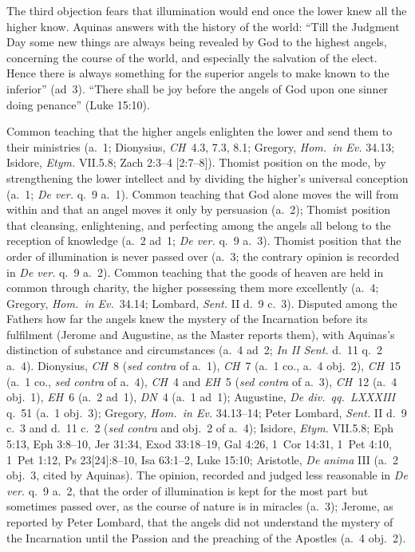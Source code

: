 The third objection fears that illumination would end once the lower knew
all the higher know. Aquinas answers with the history of the world: ``Till
the Judgment Day some new things are always being revealed by God to the
highest angels, concerning the course of the world, and especially the
salvation of the elect. Hence there is always something for the superior
angels to make known to the inferior'' (ad~3). ``There shall be joy before
the angels of God upon one sinner doing penance'' (Luke 15:10).

 {Common teaching that the higher angels enlighten the lower and send them
 to their ministries (a.~1; Dionysius, \emph{CH}~4.3, 7.3, 8.1; Gregory,
 \emph{Hom.\ in Ev.} 34.13; Isidore, \emph{Etym.} VII.5.8; Zach 2:3--4 [2:7--8]).
 Thomist position on the mode, by strengthening the lower intellect and by
 dividing the higher's universal conception (a.~1; \emph{De ver.} q.~9
 a.~1). Common teaching that God alone moves the will from within and that
 an angel moves it only by persuasion (a.~2); Thomist position that
 cleansing, enlightening, and perfecting among the angels all belong to the
 reception of knowledge (a.~2 ad~1; \emph{De ver.} q.~9 a.~3). Thomist
 position that the order of illumination is never passed over (a.~3; the
 contrary opinion is recorded in \emph{De ver.} q.~9 a.~2). Common teaching
 that the goods of heaven are held in common through charity, the higher
 possessing them more excellently (a.~4; Gregory, \emph{Hom.\ in Ev.}\ 34.14;
 Lombard, \emph{Sent.} II d.~9 c.~3). Disputed among the Fathers how far
 the angels knew the mystery of the Incarnation before its fulfilment
 (Jerome and Augustine, as the Master reports them), with Aquinas's
 distinction of substance and circumstances (a.~4 ad~2; \emph{In II Sent.}
 d.~11 q.~2 a.~4).}
 {Dionysius, \emph{CH}~8 (\emph{sed contra} of a.~1), \emph{CH}~7 (a.~1 co.,
 a.~4 obj.~2), \emph{CH}~15 (a.~1 co., \emph{sed contra} of a.~4), \emph{CH}~4 and \emph{EH}~5 (\emph{sed contra} of a.~3), \emph{CH}~12 (a.~4 obj.~1),
 \emph{EH}~6 (a.~2 ad~1), \emph{DN}~4 (a.~1 ad~1); Augustine, \emph{De
 div.\ qq.\ LXXXIII} q.~51 (a.~1 obj.~3); Gregory, \emph{Hom.\ in Ev.} 34.13--14;
 Peter Lombard, \emph{Sent.} II d.~9 c.~3 and d.~11 c.~2 (\emph{sed contra}
 and obj.~2 of a.~4); Isidore, \emph{Etym.} VII.5.8; Eph 5:13, Eph 3:8--10,
 Jer 31:34, Exod 33:18--19, Gal 4:26, 1~Cor 14:31, 1~Pet 4:10, 1~Pet 1:12,
 Ps 23[24]:8--10, Isa 63:1--2, Luke 15:10; Aristotle, \emph{De anima} III (a.~2
 obj.~3, cited by Aquinas).}
 {The opinion, recorded and judged less reasonable in \emph{De ver.} q.~9
 a.~2, that the order of illumination is kept for the most part but
 sometimes passed over, as the course of nature is in miracles (a.~3);
 Jerome, as reported by Peter Lombard, that the angels did not understand
 the mystery of the Incarnation until the Passion and the preaching of the
 Apostles (a.~4 obj.~2).}

